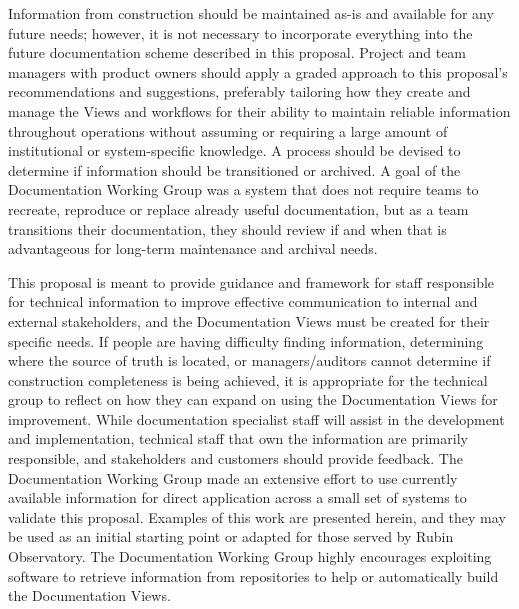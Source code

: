 Information from construction should be maintained as-is and available for any future needs; however, it is not necessary to incorporate everything into the future documentation scheme described in this proposal.
Project and team managers with product owners should apply a graded approach to this proposal's recommendations and suggestions, preferably tailoring how they create and manage the Views and workflows for their ability to maintain reliable information throughout operations without assuming or requiring a large amount of institutional or system-specific knowledge. 
A process should be devised to determine if information should be transitioned or archived.
A goal of the Documentation Working Group was a system that does not require teams to recreate, reproduce or replace already useful documentation, but as a team transitions their documentation, they should review if and when that is advantageous for long-term maintenance and archival needs.

This proposal is meant to provide guidance and framework for staff responsible for technical information to improve effective communication to internal and external stakeholders, and the Documentation Views must be created for their specific needs.
If people are having difficulty finding information, determining where the source of truth is located, or managers/auditors cannot determine if construction completeness is being achieved, it is appropriate for the technical group to reflect on how they can expand on using the Documentation Views for improvement.
While documentation specialist staff will assist in the development and implementation, technical staff that own the information are primarily responsible, and stakeholders and customers should provide feedback.
The Documentation Working Group made an extensive effort to use currently available information for direct application across a small set of systems to validate this proposal.
Examples of this work are presented herein, and they may be used as an initial starting point or adapted for those served by Rubin Observatory.
The Documentation Working Group highly encourages exploiting software to retrieve information from repositories to help or automatically build the Documentation Views.
